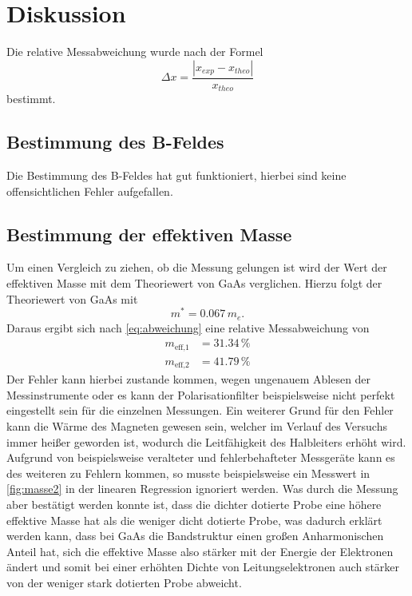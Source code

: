 \section{Diskussion}
\label{sec:Diskussion}

Die relative Messabweichung wurde nach der Formel 
\begin{equation}
    \Delta x =   \frac{ \left| x_{exp} - x_{theo} \right|   }{x_{theo}}  
    \label{eq:abweichung}
\end{equation}
bestimmt.

\subsection{Bestimmung des B-Feldes}
Die Bestimmung des B-Feldes hat gut funktioniert, hierbei sind keine offensichtlichen Fehler aufgefallen.
\subsection{Bestimmung der effektiven Masse}
Um einen Vergleich zu ziehen, ob die Messung gelungen ist wird der Wert der effektiven Masse mit dem Theoriewert von GaAs verglichen. Hierzu folgt der Theoriewert von GaAs \cite{GaAs} mit 
\begin{equation*}
    m^\ast = 0.067 \, m_e.
\end{equation*}
Daraus ergibt sich nach \eqref{eq:abweichung} eine relative Messabweichung von 
\begin{align*}
    m_{\text{eff,1}} &= 31.34\,\% \\
    m_{\text{eff,2}} &= 41.79\, \%
\end{align*}
Der Fehler kann hierbei zustande kommen, wegen ungenauem Ablesen der Messinstrumente oder es kann der Polarisationfilter beispielsweise nicht perfekt eingestellt sein für die einzelnen Messungen. Ein weiterer Grund für den Fehler kann die Wärme des Magneten gewesen sein, welcher im Verlauf des Versuchs immer heißer geworden ist, wodurch die Leitfähigkeit des Halbleiters erhöht wird. 
Aufgrund von beispielsweise veralteter und fehlerbehafteter Messgeräte kann es des weiteren zu Fehlern kommen, so musste beispielsweise ein Messwert in \autoref{fig:masse2} in der linearen Regression ignoriert werden.
Was durch die Messung aber bestätigt werden konnte ist, dass die dichter dotierte Probe eine höhere effektive Masse hat als die weniger dicht dotierte Probe, was dadurch erklärt werden kann, dass bei GaAs die Bandstruktur einen großen Anharmonischen Anteil hat, sich die effektive Masse also stärker mit der Energie der Elektronen ändert und somit bei einer erhöhten Dichte von Leitungselektronen auch stärker von der weniger stark dotierten Probe abweicht.
\clearpage